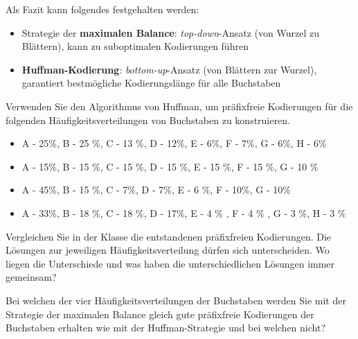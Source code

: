 Als Fazit kann folgendes festgehalten werden:
\begin{itemize}
	\item Strategie der \textbf{maximalen Balance}: \textit{top-down}-Ansatz (von Wurzel zu Blättern), kann zu suboptimalen Kodierungen führen
	\item \textbf{Huffman-Kodierung}: \textit{bottom-up}-Ansatz (von Blättern zur Wurzel), garantiert bestmögliche Kodierungslänge für alle Buchstaben
\end{itemize}

\begin{myexercise}
	Verwenden Sie den Algorithmus von Huffman, um präfixfreie Kodierungen für die folgenden Häufigkeitsverteilungen von Buchstaben zu konstruieren.
	\begin{itemize}
		\item A - 25\%, B - 25 \%, C - 13 \%, D - 12\%, E - 6\%, F - 7\%, G - 6\%, H - 6\%
		\item A - 15\%, B - 15 \%, C - 15 \%, D - 15 \%, E - 15 \%, F - 15 \%, G - 10 \%
		\item A - 45\%, B - 15 \%, C - 7\%, D - 7\%, E - 6 \%, F - 10\%, G - 10\%
		\item A - 33\%, B - 18 \%, C - 18 \%, D - 17\%, E - 4 \% , F - 4 \% , G - 3 \%, H - 3 \%
	\end{itemize}
	Vergleichen Sie in der Klasse die entstandenen präfixfreien Kodierungen. Die Lösungen
	zur jeweiligen Häufigkeitsverteilung dürfen sich unterscheiden. Wo liegen die Unterschiede
	und was haben die unterschiedlichen Lösungen immer gemeinsam?

	Bei welchen der vier Häufigkeitsverteilungen der Buchstaben werden Sie mit der Strategie
	der maximalen Balance gleich gute präfixfreie Kodierungen der Buchstaben erhalten wie mit der  Huffman-Strategie und bei welchen nicht?
\end{myexercise}

